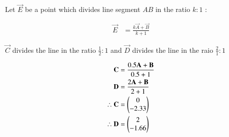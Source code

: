 \pagebreak
\begin{flushleft}
Let $\vec{E}$ be a point which divides line segment $AB$
in the ratio $k : 1$ :
\end{flushleft}
\begin{align}
\vec{E} &= \frac{k\vec{A}+\vec{B}}{k+1}
\end{align}

\begin{flushleft}
$\vec{C}$ divides the line in the ratio $\frac{1}{2} : 1 $ and $\vec{D}$ divides the line in the raio $\frac{2}{1} : 1 $
\end{flushleft}
\begin{align}
\mathbf{C} &= \frac{0.5\mathbf{A}+\mathbf{B}}{0.5+1} \\
\mathbf{D} &= \frac{2\mathbf{A}+\mathbf{B}}{2+1}\\
\therefore \mathbf{C} &= \begin{pmatrix}0\\-2.33\end{pmatrix}\\
\therefore \mathbf{D} &= \begin{pmatrix}2\\-1.66\end{pmatrix}
\end{align}
